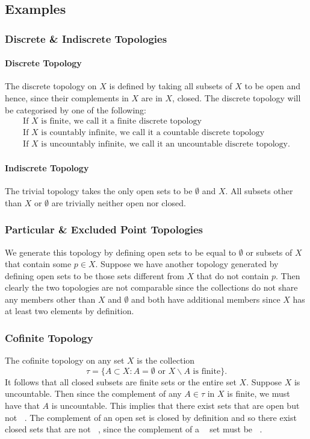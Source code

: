 \documentclass{article}
\DeclareMathOperator\Fs{F_{\sigma}}
\DeclareMathOperator\Gd{G_{\delta}}
\begin{document}
\subsubsection{}
\subsection{Examples}
\subsubsection{Discrete \& Indiscrete Topologies}
\paragraph{Discrete Topology}
The discrete topology on $X$ is defined by taking all subsets of $X$ to be
open and hence, since their complements in $X$ are in $X$, closed.
The discrete topology will be categorised by one of the following:
\begin{gather}
\text{If $X$ is finite,
we call it a finite discrete topology} \\
\text{If $X$ is countably infinite,
we call it a countable discrete topology} \\
\text{If $X$ is uncountably infinite,
we call it an uncountable discrete topology.}
\end{gather}
\paragraph{Indiscrete Topology}
The trivial topology takes the only open sets to be $\emptyset$ and $X$. All subsets other than
$X$ or $\emptyset$ are trivially neither open nor closed.
\subsubsection{Particular \& Excluded Point Topologies}
We generate this topology by defining open sets to be equal to $\emptyset$ or subsets of $X$ that contain some $p \in X$.
Suppose we have another topology generated by defining open sets to be those sets different from $X$ that do not contain $p$. Then clearly the two topologies are not comparable
since the collections do not share any members other than $X$ and $\emptyset$ and both have additional members since $X$ has at least two elements by definition.
\subsubsection{Cofinite Topology}
The cofinite topology on any set $X$ is the collection $$
\tau = \{ A \subset X : A = \emptyset \text{ or } X \backslash A \text{ is finite} \}.
$$
It follows that all closed subsets are finite sets or the entire set $X$. Suppose $X$ is
uncountable. Then since the complement of any $A \in \tau$ in $X$ is finite, we must have that $A$
is uncountable. This implies that there exist sets that are open but not $\Fs$. The complement of an open set is closed
by definition and so there exist closed sets that are not $\Gd$, since the complement of a $\Gd$ set must be $\Fs$.
\end{document}
